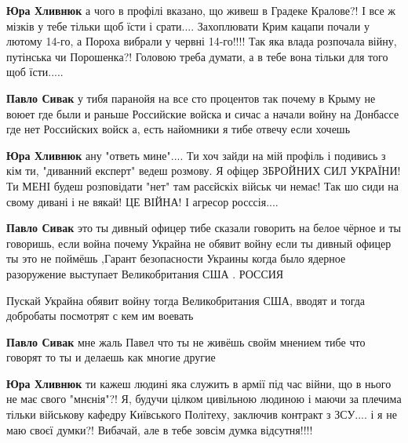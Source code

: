 \begin{itemize}
\begin{itemize}
\textbf{Юра Хливнюк} а чого в профілі вказано, що живеш в Градеке Кралове?! І
все ж мізків у тебе тільки щоб їсти і срати.... Захоплювати Крим кацапи почали
у лютому 14-го, а Пороха вибрали у червні 14-го!!!! Так яка влада розпочала
війну, путінська чи Порошенка?! Головою треба думати, а в тебе вона тільки для
того щоб їсти.....

\textbf{Павло Сивак} у тибя паранойя на все сто процентов так почему в Крыму не воюет где были и раньше Российские войска и сичас а начали войну на Донбассе где нет Российских войск а, есть найомники я тибе отвечу если хочешь

\textbf{Юра Хливнюк} ану "ответь мине".... Ти хоч зайди на мій профіль і подивись з кім ти, "диванний експерт" ведеш розмову. Я офіцер ЗБРОЙНИХ СИЛ УКРАЇНИ! Ти МЕНІ будеш розповідати "нет" там расєйскіх військ чи немає! Так шо сиди на свому дивані і не вякай! ЦЕ ВІЙНА! І агресор росссія....

\textbf{Павло Сивак} это ты дивный офицер тибе сказали говорить на белое чёрное и ты говоришь, если война почему Украйна не обявит войну если ты дивный офицер ты это не поймёшь ,Гарант безопасности Украины когда было ядерное разоружение выступает Великобритания США . РОССИЯ

Пускай Украйна обявит войну тогда Великобритания США, вводят и тогда добробаты посмотрят с кем им воевать

\textbf{Павло Сивак} мне жаль Павел что ты не живёшь свойм мнением тибе что говорят то ты и делаешь как многие другие

\textbf{Юра Хливнюк} ти кажеш людині яка служить в армії під час війни, що в нього не має свого "мнєнія"?! Я, будучи цілком цивільною людиною і маючи за плечима тільки військову кафедру Київського Політеху, заключив контракт з ЗСУ.... і я не маю своєї думки?! Вибачай, але в тебе зовсім думка відсутня!!!!


\end{itemize}
\end{itemize}
